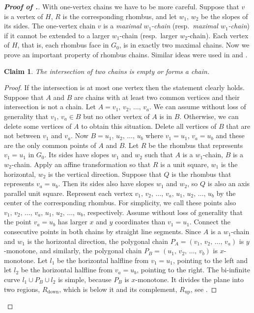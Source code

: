 \documentclass[a4paper,10pt]{article}
\newtheorem{claim}{Claim}
\begin{document}
\begin{proof}[\bf Proof of .]
With one-vertex chains we have to be more careful. Suppose that $v$ is a vertex of $H$, $R$ is the corresponding rhombus, and let $w_1$, $w_2$ be the slopes of its sides. The one-vertex chain $v$ is a {\em maximal $w_1$-chain} 
(resp.\ {\em maximal $w_1$-chain}) 
if it cannot be extended to a larger $w_1$-chain (resp.\ larger $w_2$-chain). 
Each vertex of $H$, that is, each rhombus face in $G_0$, is in exactly two maximal chains.
Now we prove an important property of rhombus chains. 
Similar ideas were used in \cite{KS92} and \cite{K93}.

\begin{claim} \label{claim:2chains}
The intersection of two chains is empty or forms a chain.
\end{claim}

\begin{proof}
If the intersection is at most one vertex then the statement clearly holds. Suppose that $A$ and $B$ are chains with at least two common vertices and their intersection is not a chain.
Let $A=v_1, \, v_2, \, \dots, \, v_a$. We can assume without loss of generality that $v_1, \, v_a \in B$ but no other vertex of $A$ is in $B$. Otherwise, we can delete some vertices of $A$ to obtain this situation. Delete all vertices of $B$ that are not between $v_1$ and $v_a$. Now $B=u_1, \, u_2, \, \dots, \, u_b$ where $v_1=u_1$, $v_a=u_b$ and these are the only common points of $A$ and $B$. Let $R$ be the rhombus that represents $v_1=u_1$ in $G_0$. Its sides have slopes $w_1$ and $w_2$ such that $A$ is a $w_1$-chain, $B$ is a $w_2$-chain. Apply an affine transformation so that $R$ is a unit square, $w_1$ is the horizontal, $w_2$ is the vertical direction. Suppose that $Q$ is the rhombus that represents $v_a=u_b$. Then its sides also have slopes $w_1$ and $w_2$, so $Q$ is also an axis parallel unit square. Represent each vertex  $v_1, \, v_2, \, \dots, \, v_a, \,
u_1, \, u_2, \, \dots, \, u_b$ by the center of the corresponding rhombus. For simplicity, we call these points also 
$v_1, \, v_2, \, \dots, \, v_a, \, u_1, \, u_2, \, \dots, \, u_b$, respectively. Assume without loss of generality that 
the point $v_a=u_b$ has larger $x$ and $y$ coordinates than $v_1=u_1$. Connect the consecutive points in both chains by straight line segments. Since $A$ is a $w_1$-chain and $w_1$ is the horizontal direction, the polygonal chain $P_A=(v_1, \, v_2, \, \dots, \, v_a)$ is $y$-monotone, and similarly, the polygonal chain $P_B=(u_1, \, v_2, \, \dots, \, v_b)$ is $x$-monotone.
Let $l_1$ be the horizontal halfline from $v_1=u_1$, pointing to the left and let $l_2$ be the horizontal halfline from $v_a=u_b$, pointing to the right. The bi-infinite curve $l_1\cup P_B\cup l_2$ is simple, because $P_B$ is $x$-monotone. It divides the plane into two regions, $R_{\text{down}}$, which is below it and its complement, $R_{\text{up}}$, see .




\end{proof}
\end{proof}
\end{document}

